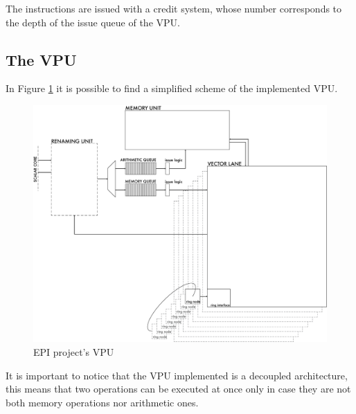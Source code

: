 The instructions are issued with a credit system, whose number corresponds to the depth of the issue queue of the VPU.



\subsection{The VPU}
In Figure \ref{VPU} it is possible to find a simplified scheme of the implemented VPU.

\begin{figure}[H]
    \centering
    \includegraphics[scale = 0.5]{Chapter_1/img/VPU.png}
    \caption{EPI project's VPU}
    \label{VPU}
\end{figure}
It is important to notice that the VPU implemented is a decoupled architecture, this means that two operations can be executed at once only in case they are not both memory operations nor arithmetic ones.


